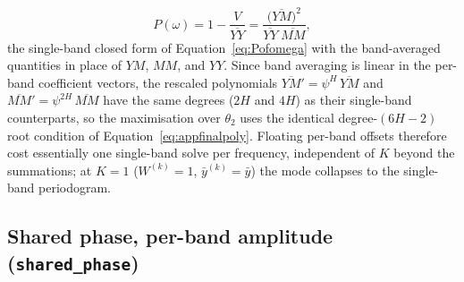 \documentclass[apj]{emulateapj}
\newcommand{\bandavg}[1]{\overline{#1}}
\newcommand{\ybar}{\bar{y}}
\newcommand{\yb}[1][k]{\ybar^{(#1)}}
\newcommand{\Wtk}[1][k]{W^{(#1)}}
\newcommand{\eith}{\psi}
\begin{document}
\begin{appendix}
\begin{equation}
P(\omega) = 1 - \frac{V}{\bandavg{YY}} = \frac{\bigl(\bandavg{YM}\bigr)^2}{\bandavg{YY}\;\bandavg{MM}},
\end{equation}
the single-band closed form of Equation~\ref{eq:Pofomega} with the band-averaged quantities in place of $YM$, $MM$, and $YY$. Since band averaging is linear in the per-band coefficient vectors, the rescaled polynomials $\bandavg{YM}{}' = \eith^{H}\,\bandavg{YM}$ and $\bandavg{MM}{}' = \eith^{2H}\,\bandavg{MM}$ have the same degrees ($2H$ and $4H$) as their single-band counterparts, so the maximisation over $\theta_2$ uses the identical degree-$(6H-2)$ root condition of Equation~\ref{eq:appfinalpoly}. Floating per-band offsets therefore cost essentially one single-band solve per frequency, independent of $K$ beyond the summations; at $K=1$ ($\Wtk=1$, $\yb=\ybar$) the mode collapses to the single-band periodogram.

\subsection{Shared phase, per-band amplitude (\texttt{shared\_phase})}
\label{app:sharedphase}


\end{appendix}
\end{document}
